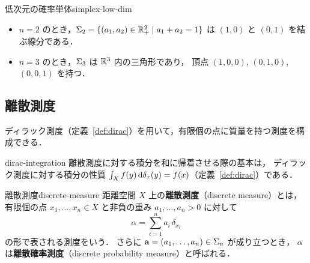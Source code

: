 \begin{example}{低次元の確率単体}{simplex-low-dim}
  \begin{itemize}
    \item $n = 2$ のとき，$\Sigma_2 = \{(a_1, a_2) \in \mathbb{R}_+^2 \mid a_1 + a_2 = 1\}$
      は $(1, 0)$ と $(0, 1)$ を結ぶ線分である．
    \item $n = 3$ のとき，$\Sigma_3$ は $\mathbb{R}^3$ 内の三角形であり，
      頂点 $(1,0,0)$, $(0,1,0)$, $(0,0,1)$ を持つ．
  \end{itemize}

  \begin{center}
  \end{center}
\end{example}

\subsection{離散測度}
\label{subsec:discrete-measures}

ディラック測度（定義~\ref{def:dirac}）を用いて，有限個の点に質量を持つ測度を構成できる．

\begin{remark}{}{dirac-integration}
  離散測度に対する積分を和に帰着させる際の基本は，
  ディラック測度に対する積分の性質
  $\int_X f(y) \, \mathrm{d}\delta_x(y) = f(x)$（定義~\ref{def:dirac}）である．
\end{remark}

\begin{definition}{離散測度}{discrete-measure}
  距離空間 $X$ 上の\textbf{離散測度}（discrete measure）とは，
  有限個の点 $x_1, \ldots, x_n \in X$ と非負の重み $a_1, \ldots, a_n > 0$ に対して
  \[
    \alpha = \sum_{i=1}^n a_i \, \delta_{x_i}
  \]
  の形で表される測度をいう．
  さらに $\mathbf{a} = (a_1, \ldots, a_n) \in \Sigma_n$ が成り立つとき，
  $\alpha$ は\textbf{離散確率測度}（discrete probability measure）と呼ばれる．
\end{definition}

